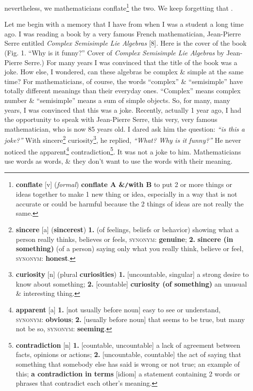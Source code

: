 \documentclass[oneside]{book}
\numberwithin{equation}{section}
\begin{document}
nevertheless, we mathematicians conflate\footnote{\textbf{conflate} [v] (\textit{formal}) \textbf{conflate A \&\texttt{/}with B} to put 2 or more things or ideas together to make 1 new thing or idea, especially in a way that is not accurate or could be harmful because the 2 things of ideas are not really the same.} the two. We keep forgetting that .

Let me begin with a memory that I have from when I was a student a long time ago. I was reading a book by a very famous French mathematician, Jean-Pierre Serre entitled \textit{Complex Semisimple Lie Algebras} [8]. Here is the cover of the book (\textsf{Fig. 1. ``Why is it funny?'' Cover of \textit{Complex Semisimple Lie Algebras} by Jean-Pierre Serre.}) For many years I was convinced that the title of the book was a joke. How else, I wondered, can these algebras be complex \& simple at the same time? For mathematicians, of course, the words ``complex'' \& ``semisimple'' have totally different meanings than their everyday ones. ``Complex'' means complex number \& ``semisimple'' means a sum of simple objects. So, for many, many years, I was convinced that this was a joke. Recently, actually 1 year ago, I had the opportunity to speak with Jean-Pierre Serre, this very, very famous mathematician, who is now 85 years old. I dared ask him the question: \textit{``is this a joke?''} With sincere\footnote{\textbf{sincere} [a] (\textbf{sincerest}) \textbf{1.} (of feelings, beliefs or behavior) showing what a person really thinks, believes or feels, \textsc{synonym}: \textbf{genuine}; \textbf{2.} \textbf{sincere (in something)} (of a person) saying only what you really think, believe or feel, \textsc{synonym}: \textbf{honest}.} curiosity\footnote{\textbf{curiosity} [n] (plural \textbf{curiosities}) \textbf{1.} [uncountable, singular] a strong desire to know about something; \textbf{2.} [countable] \textbf{curiosity (of something)} an unusual \& interesting thing.}, he replied, \textit{``What? Why is it funny?''} He never noticed the apparent\footnote{\textbf{apparent} [a] \textbf{1.} [not usually before noun] easy to see or understand, \textsc{synonym}: \textbf{obvious}; \textbf{2.} [usually before noun] that seems to be true, but many not be so, \textsc{synonym}: \textbf{seeming}.} contradiction\footnote{\textbf{contradiction} [n] \textbf{1.} [countable, uncountable] a lack of agreement between facts, opinions or actions; \textbf{2.} [uncountable, countable] the act of saying that something that somebody else has said is wrong or not true; an example of this; \textbf{a contradiction in terms} [idiom] a statement containing 2 words or phrases that contradict each other's meaning.}. It was not a joke to him. Mathematicians use words as words, \& they don't want to use the words with their meaning.
\end{document}
